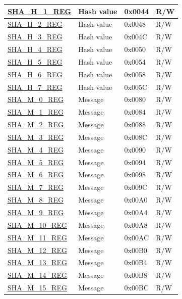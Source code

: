 \begin{longtable}{ | p{6cm} | p{7.2cm} | p{1.3cm} | p{1cm} | }
\hyperref[regdesc:SHAHNREG]{SHA\_H\_1\_REG} & Hash value & 0x0044 & R/W \\ \hline
\hyperref[regdesc:SHAHNREG]{SHA\_H\_2\_REG} & Hash value & 0x0048 & R/W \\ \hline
\hyperref[regdesc:SHAHNREG]{SHA\_H\_3\_REG} & Hash value & 0x004C & R/W \\ \hline
\hyperref[regdesc:SHAHNREG]{SHA\_H\_4\_REG} & Hash value & 0x0050 & R/W \\ \hline
\hyperref[regdesc:SHAHNREG]{SHA\_H\_5\_REG} & Hash value & 0x0054 & R/W \\ \hline
\hyperref[regdesc:SHAHNREG]{SHA\_H\_6\_REG} & Hash value & 0x0058 & R/W \\ \hline
\hyperref[regdesc:SHAHNREG]{SHA\_H\_7\_REG} & Hash value & 0x005C & R/W \\ \hline
\hyperref[regdesc:SHAMNREG]{SHA\_M\_0\_REG} & Message & 0x0080 & R/W \\ \hline
\hyperref[regdesc:SHAMNREG]{SHA\_M\_1\_REG} & Message & 0x0084 & R/W \\ \hline
\hyperref[regdesc:SHAMNREG]{SHA\_M\_2\_REG} & Message & 0x0088 & R/W \\ \hline
\hyperref[regdesc:SHAMNREG]{SHA\_M\_3\_REG} & Message & 0x008C & R/W \\ \hline
\hyperref[regdesc:SHAMNREG]{SHA\_M\_4\_REG} & Message & 0x0090 & R/W \\ \hline
\hyperref[regdesc:SHAMNREG]{SHA\_M\_5\_REG} & Message & 0x0094 & R/W \\ \hline
\hyperref[regdesc:SHAMNREG]{SHA\_M\_6\_REG} & Message & 0x0098 & R/W \\ \hline
\hyperref[regdesc:SHAMNREG]{SHA\_M\_7\_REG} & Message & 0x009C & R/W \\ \hline
\hyperref[regdesc:SHAMNREG]{SHA\_M\_8\_REG} & Message & 0x00A0 & R/W \\ \hline
\hyperref[regdesc:SHAMNREG]{SHA\_M\_9\_REG} & Message & 0x00A4 & R/W \\ \hline
\hyperref[regdesc:SHAMNREG]{SHA\_M\_10\_REG} & Message & 0x00A8 & R/W \\ \hline
\hyperref[regdesc:SHAMNREG]{SHA\_M\_11\_REG} & Message & 0x00AC & R/W \\ \hline
\hyperref[regdesc:SHAMNREG]{SHA\_M\_12\_REG} & Message & 0x00B0 & R/W \\ \hline
\hyperref[regdesc:SHAMNREG]{SHA\_M\_13\_REG} & Message & 0x00B4 & R/W \\ \hline
\hyperref[regdesc:SHAMNREG]{SHA\_M\_14\_REG} & Message & 0x00B8 & R/W \\ \hline
\hyperref[regdesc:SHAMNREG]{SHA\_M\_15\_REG} & Message & 0x00BC & R/W \\ \hline
\end{longtable}
